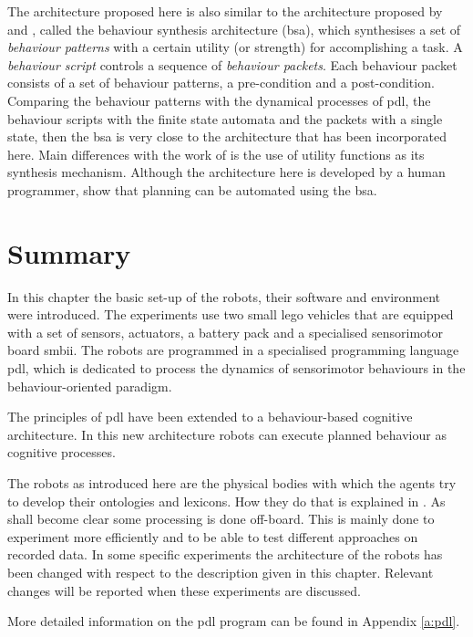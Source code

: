 
The architecture proposed here is also similar to the architecture proposed by \citet{barnes:1996} and \citet{barnesetal:1997}, called the behaviour synthesis architecture ({\sc bsa}), which synthesises a set of {\em behaviour patterns} with a certain utility (or strength) for accomplishing a task. A {\em behaviour script} controls a sequence of {\em behaviour packets}. Each behaviour packet consists of a set of behaviour patterns, a pre-condition and a post-condition. Comparing the behaviour patterns with the dynamical processes of {\sc pdl}, the behaviour scripts with the finite state automata and the packets with a single state, then the {\sc bsa} is very close to the architecture that has been incorporated here. Main differences with the work of \citet{barnes:1996} is the use of utility functions as its synthesis mechanism. Although the architecture here is developed by a human programmer, \citet{barnesetal:1997} show that planning can be automated using the {\sc bsa}.


\section{Summary}

In this chapter the basic set-up of the robots, their software and environment were introduced. The experiments use two small {\sc lego} vehicles that are equipped with a set of sensors, actuators, a battery pack and a specialised sensorimotor board {\sc smbii}. The robots are programmed in a specialised programming language {\sc pdl}, which is dedicated to process the dynamics of sensorimotor behaviours in the behaviour-oriented paradigm.

The principles of {\sc pdl} have been extended to a behaviour-based cognitive architecture. In this new architecture robots can execute planned behaviour as cognitive processes.

The robots as introduced here are the physical bodies with which the agents try to develop their ontologies and lexicons. How they do that is explained in . As shall become clear some processing is done off-board. This is mainly done to experiment more efficiently and to be able to test different approaches on recorded data.  In some specific experiments the architecture of the robots has been changed with respect to the description given in this chapter. Relevant changes will be reported when these experiments are discussed.

More detailed information on the {\sc pdl} program can be found in Appendix \ref{a:pdl}.
